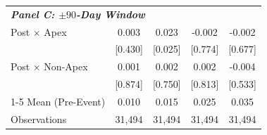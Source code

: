 {\begin{tabular}{l*{4}{c}}
\midrule \multicolumn{5}{l}{\textbf{\textit{Panel C: $\pm 90$-Day Window}}} \\
Post $\times$ Apex      &  0.003         &  0.023\sym{**} & -0.002         & -0.002         \\
                        & [0.430]        & [0.025]        & [0.774]        & [0.677]        \\
Post $\times$ Non-Apex  &  0.001         &  0.002         &  0.002         & -0.004         \\
                        & [0.874]        & [0.750]        & [0.813]        & [0.533]        \\
\cmidrule(lr){1-5}
Mean (Pre-Event)        &  0.010         &  0.015         &  0.025         &  0.035         \\
Observations            &  31{,}494      &  31{,}494      &  31{,}494      &  31{,}494      \\
\bottomrule
\end{tabular}
}
